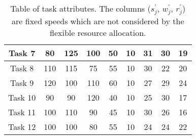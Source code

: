 \begin{table}[h]
\begin{minipage}{3.5in}
\begin{tabular}{|c|c|c|c|c|c|c|c|c|}
            Task 7  & 80    & 125   & 100   & 50    & 10    & 31        & 30        & 19        \\ \hline
            Task 8  & 110   & 115   & 75    & 55    & 10    & 30        & 22        & 20        \\ \hline
            Task 9  & 120   & 100   & 110   & 60    & 10    & 27        & 29        & 24        \\ \hline
            Task 10 & 90    & 90    & 120   & 40    & 10    & 25        & 30        & 17        \\ \hline
            Task 11 & 100   & 110   & 90    & 45    & 10    & 30        & 26        & 16        \\ \hline
            Task 12 & 100   & 100   & 80    & 55    & 10    & 24        & 24        & 22        \\ \hline
        \end{tabular}
        \caption{Table of task attributes. The columns ($s^{'}_j$, $w^{'}_j$, $r^{'}_j$) are fixed speeds which are not
        considered by the flexible resource allocation.}
    \end{minipage}
    \label{tab:example-tasks-server-properties}
\end{table}

